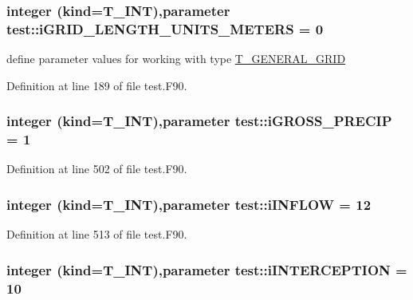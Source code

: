 \hypertarget{namespacetest_a136c3b9231683ffea8eae2e7920d956d}{
\subsubsection[{iGRID\_\-LENGTH\_\-UNITS\_\-METERS}]{\setlength{\rightskip}{0pt plus 5cm}integer (kind={\bf T\_\-INT}),parameter {\bf test::iGRID\_\-LENGTH\_\-UNITS\_\-METERS} = 0}}
\label{namespacetest_a136c3b9231683ffea8eae2e7920d956d}


define parameter values for working with type \hyperlink{typetest_1_1_t___g_e_n_e_r_a_l___g_r_i_d}{T\_\-GENERAL\_\-GRID} 



Definition at line 189 of file test.F90.

\hypertarget{namespacetest_a54d657be83774d91310d0ad6ab3d773f}{
\subsubsection[{iGROSS\_\-PRECIP}]{\setlength{\rightskip}{0pt plus 5cm}integer (kind={\bf T\_\-INT}),parameter {\bf test::iGROSS\_\-PRECIP} = 1}}
\label{namespacetest_a54d657be83774d91310d0ad6ab3d773f}


Definition at line 502 of file test.F90.

\hypertarget{namespacetest_a47075af8f8a4e815471731dc40aa7928}{
\subsubsection[{iINFLOW}]{\setlength{\rightskip}{0pt plus 5cm}integer (kind={\bf T\_\-INT}),parameter {\bf test::iINFLOW} = 12}}
\label{namespacetest_a47075af8f8a4e815471731dc40aa7928}


Definition at line 513 of file test.F90.

\hypertarget{namespacetest_a51eed4733166940c15eaafaa291fc55b}{
\subsubsection[{iINTERCEPTION}]{\setlength{\rightskip}{0pt plus 5cm}integer (kind={\bf T\_\-INT}),parameter {\bf test::iINTERCEPTION} = 10}}
\label{namespacetest_a51eed4733166940c15eaafaa291fc55b}


